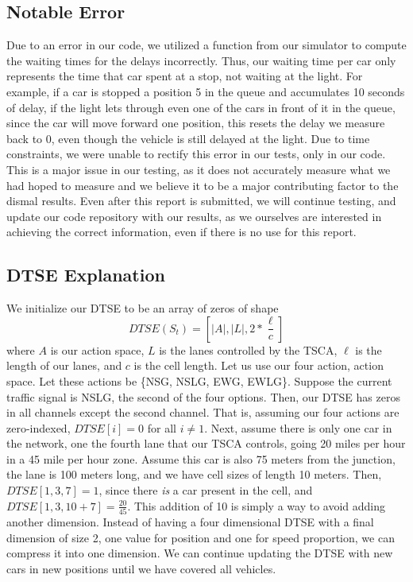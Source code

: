 \documentclass[12pt,twocolumn]{article}
\begin{document}
\subsection{Notable Error}
\label{sec:delay_error}

Due to an error in our code, we utilized a function from our simulator to compute the waiting times for the delays incorrectly. Thus, our waiting time per car only represents the time that car spent at a stop, not waiting at the light. For example, if a car is stopped a position 5 in the queue and accumulates 10 seconds of delay, if the light lets through even one of the cars in front of it in the queue, since the car will move forward one position, this resets the delay we measure back to 0, even though the vehicle is still delayed at the light. Due to time constraints, we were unable to rectify this error in our tests, only in our code. This is a major issue in our testing, as it does not accurately measure what we had hoped to measure and we believe it to be a major contributing factor to the dismal results. Even after this report is submitted, we will continue testing, and update our code repository with our results, as we ourselves are interested in achieving the correct information, even if there is no use for this report.

\subsection{DTSE Explanation}
\label{sec:DTSE_explanation}

We initialize our DTSE to be an array of zeros of shape 
\[
    DTSE(S_t) = [|A|, |L|, 2*\frac{\ell}{c}]
\] where \(A\) is our action space, \(L\) is the lanes controlled by the TSCA, \(\ell\) is the length of our lanes, and \(c\) is the cell length. Let us use our four action, action space. Let these actions be \{NSG, NSLG, EWG, EWLG\}. Suppose the current traffic signal is NSLG, the second of the four options. Then, our DTSE has zeros in all channels except the second channel. That is, assuming our four actions are zero-indexed, \(DTSE[i] = 0\) for all \(i \neq 1\). Next, assume there is only one car in the network, one the fourth lane that our TSCA controls, going 20 miles per hour in a 45 mile per hour zone. Assume this car is also 75 meters from the junction, the lane is 100 meters long, and we have cell sizes of length 10 meters. Then, \(DTSE[1,3,7] = 1\), since there \emph{is} a car present in the cell, and \(DTSE[1,3,10+7] = \frac{20}{45}\). This addition of 10 is simply a way to avoid adding another dimension. Instead of having a four dimensional DTSE with a final dimension of size 2, one value for position and one for speed proportion, we can compress it into one dimension. We can continue updating the DTSE with new cars in new positions until we have covered all vehicles.
\end{document}
